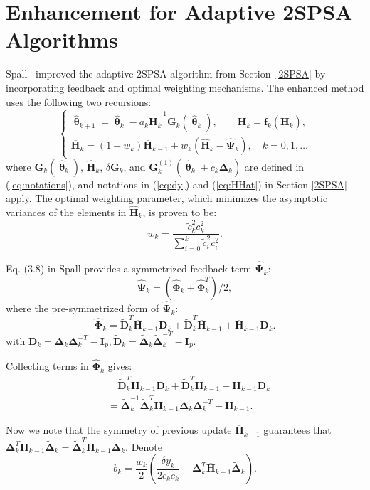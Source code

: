 \documentclass[conference,10.3cpt]{IEEEtran}
\newcommand{\bD}{\bm{D}}
\newcommand{\bG}{\bm{G}}
\newcommand{\bI}{\bm{I}}
\newcommand{\bDelta}{\bm{\Delta}}
\newcommand{\oH}{\bm{\overline{H}}}
\newcommand{\ooH}{\bm{\overline{\overline{H}}}}
\newcommand{\hH}{\bm{\hat{H}}}
\newcommand{\hPsi}{\bm{\hat{\Psi}}}
\newcommand{\htheta}{\bm{\hat{\uptheta}}}
\newcommand{\hPhi}{\bm{\hat{\Phi}}}
\newcommand{\tDelta}{\bm{\tilde{\Delta}}}
\newcommand{\tD}{\bm{\tilde{D}}}
\begin{document}
\section{Enhancement for Adaptive 2SPSA Algorithms}  \label{Enhanced 2SPSA}
Spall~\cite{Spall2009} improved the adaptive 2SPSA
algorithm from Section~\ref{2SPSA} by incorporating feedback and
optimal weighting mechanisms. The enhanced method
uses the following two recursions:
\begin{equation} \label{eq:Enhancement}
  \begin{cases} \htheta_{k+1}=\htheta_k-a_k\ooH_k^{-1} \bG_k(\htheta_k),
    \qquad \bm{\ooH}_k=\bm{f}_k(\oH_k),\\
    \oH_k=(1-w_k)\oH_{k-1}+w_k(\hH_k-\hPsi_k),
    \quad k=0,1,\dots
  \end{cases}
\end{equation}
where $\bG_k(\htheta_k)$, $\hH_k$,
$\delta\bG_k$, and $\bG_k^{(1)}(\htheta_k\pm c_k\bDelta_k)$ are
defined in (\ref{eq:notations}), and notations in (\ref{eq:dy}) and
(\ref{eq:HHat}) in Section \ref{2SPSA} apply. The optimal weighting
parameter, which minimizes the asymptotic variances of the elements in
$\hH_k$, is proven to be:
\begin{equation} \label{eq:weighting}
  w_k=\frac{\tilde{c}_k^2c_k^2}{\sum_{i=0}^{k}\tilde{c}_i^2c_i^2}.
\end{equation}

Eq. (3.8) in Spall \cite{Spall2009} provides a symmetrized feedback term $ \hPsi_k $:
\begin{equation} \label{eq:PsiHat}
\hPsi_k =(\hPhi_k+\hPhi_k^T)/2,
\end{equation}
where the pre-symmetrized form of $ \hPsi_k $:
\begin{equation}
\hPhi_k=\tD_k^T\oH_{k-1}\bD_k+\tD_k^T\oH_{k-1}+\oH_{k-1}\bD_k.
\end{equation}
with $ \bD_k=\bDelta_k\bDelta_k^{-T}-\bI_p, \tD_k=\tDelta_k\tDelta_k^{-T}-\bI_p $.

Collecting terms in $\hPhi_k$ gives:
\begin{align*}
&\quad\tD_k^T\oH_{k-1}\bD_k+\tD_k^T\oH_{k-1}+\oH_{k-1}\bD_k\\
&=\tDelta_k^{-1}\tDelta_k^{T}\oH_{k-1}\bDelta_k\bDelta_k^{-T}-\oH_{k-1}.
\end{align*}

Now we note that the symmetry of previous update $ \oH_{k-1}$ guarantees that
$\bDelta_k^{T}\oH_{k-1}\tDelta_k=\tDelta_k^{T}\oH_{k-1}\bDelta_k$. Denote
\begin{equation}
  b_k=\frac{w_k}{2}(\frac{\delta y_k}{2c_k\tilde{c}_k}-\bDelta_k^{T}\oH_{k-1}\tDelta_k).
\end{equation}
\end{document}
